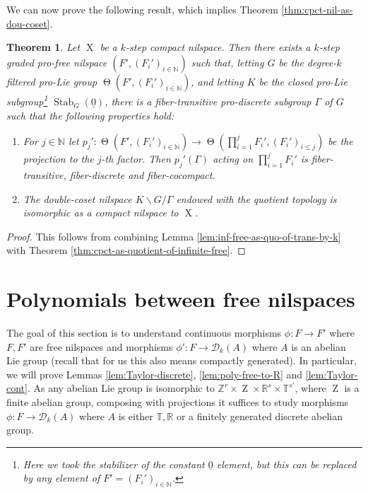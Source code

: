 \documentclass[a4paper,12pt,reqno]{amsart}
\newtheorem{theorem}{Theorem}[section]
\theoremstyle{definition}
\def\to{\rightarrow}
\newcommand{\mc}{\mathcal}
\newcommand{\mb}{\mathbb}
\DeclareMathOperator{\stab}{Stab}
\DeclareMathOperator{\ab}{Z}
\DeclareMathOperator{\tran}{\Theta}
\DeclareMathOperator{\ns}{X}
\begin{document}
We can now prove the following result, which implies Theorem \ref{thm:cpct-nil-as-dou-coset}.
\begin{theorem}
Let $\ns$ be a $k$-step compact nilspace. Then there exists a $k$-step graded pro-free nilspace $(F',(F_i')_{i\in \mb{N}})$ such that, letting $G$ be  the degree-$k$ filtered pro-Lie group $\tran(F',(F_i')_{i\in \mb{N}})$, and letting $K$ be the closed pro-Lie subgroup\footnote{Here we took the stabilizer of the constant $\underline{0}$ element, but this can be replaced by any element of $F'=(F_i')_{i\in \mb{N}}$.} $\stab_G(\underline{0})$, there is a fiber-transitive pro-discrete subgroup $\Gamma$ of $G$ such that the following properties hold:
\setlength{\leftmargini}{0.7cm}
\begin{enumerate}
    \item For $j\in \mb{N}$ let $p_j':\tran(F',(F_i')_{i\in \mb{N}})\to \tran(\prod_{i=1}^jF_i',(F_i')_{i\le j})$ be the projection to the $j$-th factor. Then $p_j'(\Gamma)$ acting on $\prod_{i=1}^jF_i'$ is fiber-transitive, fiber-discrete and fiber-cocompact.
    \item The double-coset nilspace $K\backslash G/\Gamma$ endowed with the quotient topology is isomorphic as a compact nilspace to $\ns$.
\end{enumerate}
\end{theorem} 

\begin{proof}
This follows from combining Lemma \ref{lem:inf-free-as-quo-of-trans-by-k} with Theorem \ref{thm:cpct-as-quotient-of-infinite-free}.
\end{proof}







\appendix

\section{Polynomials between free nilspaces}\label{app:Taylor}

\noindent The goal of this section is to understand continuous morphisms $\phi:F\to F'$ where $F,F'$ are free nilspaces and morphisms $\phi':F\to \mc{D}_k(A)$ where $A$ is an abelian Lie group (recall that for us this also means compactly generated). In particular, we will prove Lemmas \ref{lem:Taylor-discrete}, \ref{lem:poly-free-to-R} and \ref{lem:Taylor-cont}. As any abelian Lie group is isomorphic to $\mb{Z}^r\times \ab\times \mb{R}^s\times \mb{T}^{s'}$, where $\ab$ is a finite abelian group, composing with projections it suffices to study morphisms $\phi:F\to \mc{D}_k(A)$ where $A$ is either $\mb{T},\mb{R}$ or a finitely generated discrete abelian group.
\end{document}
